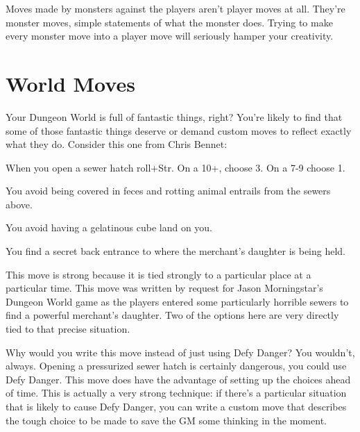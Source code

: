        

Moves made by monsters against the players aren't player moves at all. They're monster moves, simple statements of what the monster does. Trying to make every monster move into a player move will seriously hamper your creativity.

       
\section{World Moves}    
       

Your Dungeon World is full of fantastic things, right? You're likely to find that some of those fantastic things deserve or demand custom moves to reflect exactly what they do. Consider this one from Chris Bennet:

       
\startExample
When you open a sewer hatch roll+Str. On a 10+, choose 3. On a 7-9 choose 1.
\stopExample
       
\startitemize[1,packed]
         
\item You avoid being covered in feces and rotting animal entrails from the sewers above.

         
\item You avoid having a gelatinous cube land on you.

         
\item You find a secret back entrance to where the merchant's daughter is being held.

       
\stopitemize
       

This move is strong because it is tied strongly to a particular place at a particular time. This move was written by request for Jason Morningstar's Dungeon World game as the players entered some particularly horrible sewers to find a powerful merchant's daughter. Two of the options here are very directly tied to that precise situation.

       

Why would you write this move instead of just using Defy Danger? You wouldn't, always. Opening a pressurized sewer hatch is certainly dangerous, you could use Defy Danger. This move does have the advantage of setting up the choices ahead of time. This is actually a very strong technique: if there's a particular situation that is likely to cause Defy Danger, you can write a custom move that describes the tough choice to be made to save the GM some thinking in the moment.

